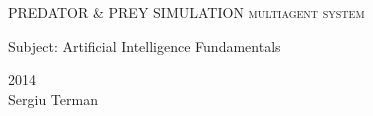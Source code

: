 \begin{titlepage}
    \centering
    \vspace*{30 mm}
    {\huge
    	PREDATOR \& PREY SIMULATION
    	{\scshape multiagent system}
    }
    
    \vspace{30 mm}
    {\Large Subject: Artificial Intelligence Fundamentals}
    
    \vfill
    {\scshape 2014} \\
    {\large Sergiu Terman}
\end{titlepage}
